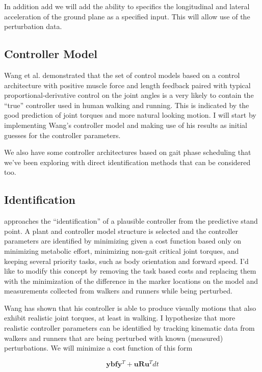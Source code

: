 \documentclass[11pt]{article}
\begin{document}
In addition add we will add the ability to specifics the longitudinal and
lateral acceleration of the ground plane as a specified input. This will allow
use of the perturbation data.

\subsection*{Controller Model}

Wang et al. demonstrated that the set of control models based on a control
architecture with positive muscle force and length feedback paired with typical
proportional-derivative control on the joint angles is a very likely to contain
the ``true'' controller used in human walking and running. This is indicated by
the good prediction of joint torques and more natural looking motion. I will
start by implementing Wang's controller model and making use of his results as
initial guesses for the controller parameters.

We also have some controller architectures based on gait phase scheduling that
we've been exploring with direct identification methods that can be considered
too.

\subsection*{Identification}

\cite{Wang2012} approaches the ``identification'' of a plausible controller
from the predictive stand point. A plant and controller model structure is
selected and the controller parameters are identified by minimizing given a
cost function based only on minimizing metabolic effort, minimizing non-gait
critical joint torques, and keeping several priority tasks, such as body
orientation and forward speed. I'd like to modify this concept by removing the
task based costs and replacing them with the minimization of the difference in
the marker locations on the model and measurements collected from walkers and
runners while being perturbed.

Wang has shown that his controller is able to produce visually motions that
also exhibit realistic joint torques, at least in walking. I hypothesize that
more realistic controller parameters can be identified by tracking kinematic
data from walkers and runners that are being perturbed with known (measured)
perturbations. We will minimize a cost function of this form

\begin{equation}
  \mathbf{y}\mathbf{bf}\mathbf{y}^T +
  \mathbf{u}\mathbf{R}\mathbf{u}^T dt
\end{equation}
\end{document}
